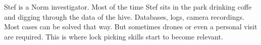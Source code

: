 \newpage
\begin{npcBox}[title=Stef continued]
    
    \begin{stressSection}
    \end{stressSection}
    \begin{tabularx}{\textwidth}{ XX }
    \end{tabularx}
    
    \begin{consequences}
    \item {}
    \item {}
    \item {}
    \end{consequences}
    
    \begin{npcDescription}
    Stef is a Norm investigator. Most of the time Stef sits in the park drinking coffe and digging through the data of the hive. Databases, logs, camera recordings. Most cases can be solved that way. But sometimes drones or even a personal visit are required. This is where lock picking skills start to become relevant.
    \end{npcDescription}
    
\end{npcBox}


